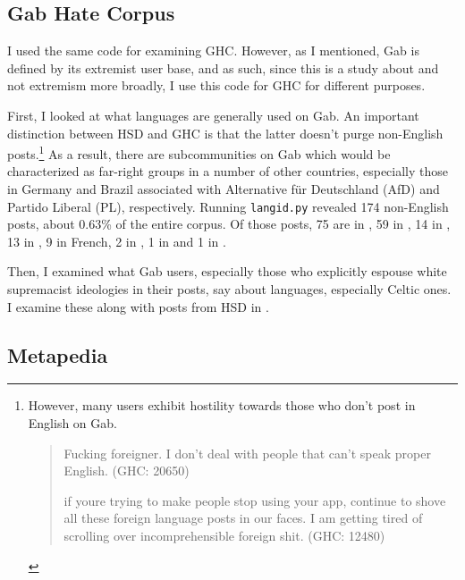 \documentclass[output=paper,colorlinks,citecolor=brown]{langscibook}
\begin{document}
\subsection{Gab Hate Corpus}

I used the same code for examining GHC. However, as I mentioned, Gab is defined by its extremist user base, and as such, since this is a study about and not extremism more broadly, I use this code for GHC for different purposes.

First, I looked at what languages are generally used on Gab. An important distinction between HSD and GHC is that the latter doesn't purge non-English posts.\footnote{However, many users exhibit hostility towards those who don't post in English on Gab.

\begin{quote} 
Fucking foreigner. I don't deal with people that can't speak proper English. (GHC: 20650)

if you\textquotesingle re trying to make people stop using your app, continue to shove all these foreign language posts in our faces. I am getting tired of scrolling over incomprehensible foreign shit. (GHC: 12480) 
\end{quote}} As a result, there are subcommunities on Gab which would be characterized as far-right groups in a number of other countries, especially those in Germany and Brazil associated with Alternative für Deutschland (AfD) and Partido Liberal (PL), respectively. Running \texttt{langid.py} revealed 174 non-English posts, about 0.63\% of the entire corpus. Of those posts, 75 are in , 59 in , 14 in , 13 in , 9 in French, 2 in , 1 in  and 1 in .

Then, I examined what Gab users, especially those who explicitly espouse white supremacist ideologies in their posts, say about languages, especially Celtic ones. I examine these along with posts from HSD in .


\subsection{Metapedia}
\end{document}
